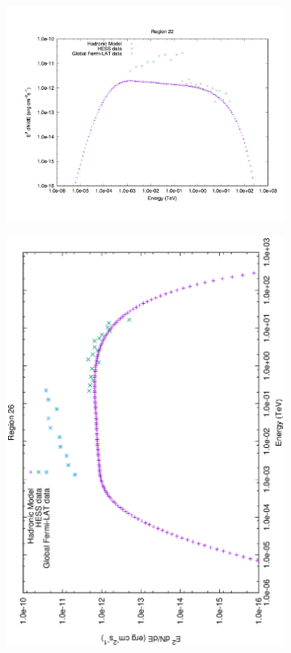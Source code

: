 \documentclass[12pt,a4paper]{article}
\begin{document}
\begin{figure}[H]
\begin{subfigure}{0.5\textwidth}
		\label{fig:rxj1713lephad16}
	\end{subfigure}
	\begin{subfigure}{0.5\textwidth}
		\centering
		\includegraphics[width=0.7\linewidth, height=0.27\textheight, angle=-90]{rxj1713_had22}
		\label{fig:rxj1713lephad21}
	\end{subfigure}
	\begin{subfigure}{0.5\textwidth}
		\centering
		\includegraphics[width=0.7\linewidth, height=0.27\textheight, angle=-90]{rxj1713_had26}
		\label{fig:rxj1713lephad22}
	\end{subfigure}
	\begin{subfigure}{0.5\textwidth}

\end{subfigure}
\end{figure}
\end{document}
